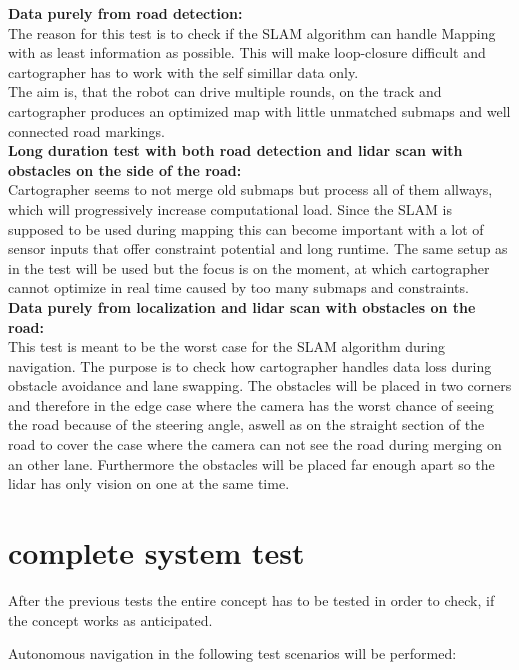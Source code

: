 \textbf{Data purely from road detection:}\\
The reason for this test is to check if the SLAM algorithm can handle Mapping with as least information as possible. This will make loop-closure difficult and cartographer has to work with the self simillar data only.\\
The aim is, that the robot can drive multiple rounds, on the track and cartographer produces an optimized map with little unmatched submaps and well connected road markings.\\

\textbf{Long duration test with both road detection and lidar scan with obstacles on the side of the road:}\\
Cartographer seems to not merge old submaps but process all of them allways, which will progressively increase computational load. Since the SLAM is supposed to be used during mapping this can become important with a lot of sensor inputs that offer constraint potential and long runtime.
The same setup as in the  test will be used but the focus is on the moment, at which cartographer cannot optimize in real time caused by too many submaps and constraints.\\


\textbf{Data purely from localization and lidar scan with obstacles on the road:}\\
This test is meant to be the worst case for the SLAM algorithm during navigation. The purpose is to check how cartographer handles data loss during obstacle avoidance and lane swapping.
The obstacles will be placed in two corners and therefore in the edge case where the camera has the worst chance of seeing the road because of the steering angle, aswell as on the straight section of the road to cover the case where the camera can not see the road during merging on an other lane. Furthermore the obstacles will be placed far enough apart so the lidar has only vision on one at the same time.\\


\section{complete system test}

After the previous tests the entire concept has to be tested in order to check, if the concept works as anticipated.

Autonomous navigation in the following test scenarios will be performed:

